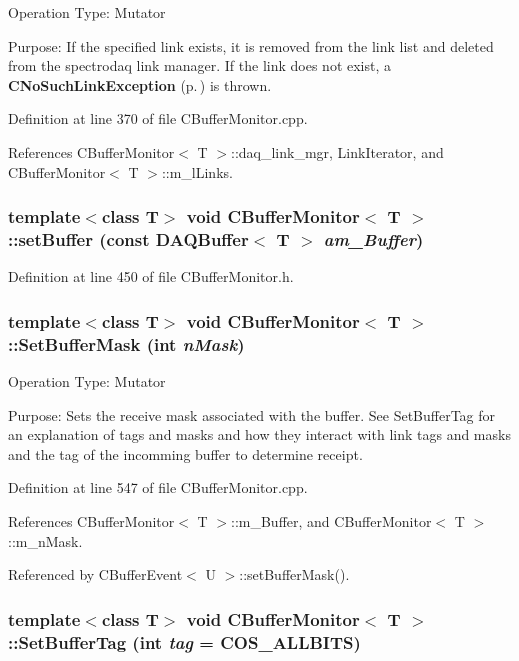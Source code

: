 Operation Type: Mutator

Purpose: If the specified link exists, it is removed from the link list and deleted from the spectrodaq link manager. If the link does not exist, a {\bf CNo\-Such\-Link\-Exception} {\rm (p.\,\pageref{classCNoSuchLinkException})} is thrown. 

Definition at line 370 of file CBuffer\-Monitor.cpp.

References CBuffer\-Monitor$<$ T $>$::daq\_\-link\_\-mgr, Link\-Iterator, and CBuffer\-Monitor$<$ T $>$::m\_\-l\-Links.
\subsubsection{\setlength{\rightskip}{0pt plus 5cm}template$<$class T$>$ void CBuffer\-Monitor$<$ T $>$::set\-Buffer (const DAQBuffer$<$ T $>$ {\em am\_\-Buffer})\hspace{0.3cm}{\tt  [inline, protected]}}\label{classCBufferMonitor_b0}




Definition at line 450 of file CBuffer\-Monitor.h.
\subsubsection{\setlength{\rightskip}{0pt plus 5cm}template$<$class T$>$ void CBuffer\-Monitor$<$ T $>$::Set\-Buffer\-Mask (int {\em n\-Mask})}\label{classCBufferMonitor_a16}


Operation Type: Mutator

Purpose: Sets the receive mask associated with the buffer. See Set\-Buffer\-Tag for an explanation of tags and masks and how they interact with link tags and masks and the tag of the incomming buffer to determine receipt. 

Definition at line 547 of file CBuffer\-Monitor.cpp.

References CBuffer\-Monitor$<$ T $>$::m\_\-Buffer, and CBuffer\-Monitor$<$ T $>$::m\_\-n\-Mask.

Referenced by CBuffer\-Event$<$ U $>$::set\-Buffer\-Mask().
\subsubsection{\setlength{\rightskip}{0pt plus 5cm}template$<$class T$>$ void CBuffer\-Monitor$<$ T $>$::Set\-Buffer\-Tag (int {\em tag} = {\bf COS\_\-ALLBITS})}\label{classCBufferMonitor_a15}


